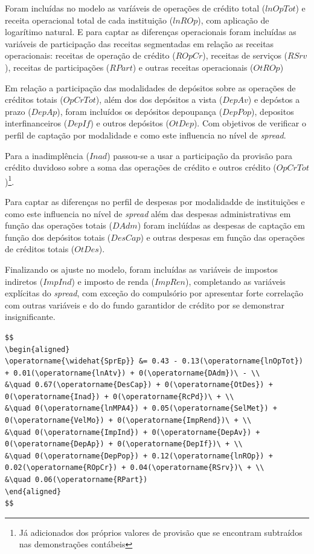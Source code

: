\documentclass[12pt,12pt,openright,oneside,a4paper,chapter=TITLE,section=TITLE,subsection=TITLE,subsubsection=TITLE,english,french,spanish,portugues,sumario=tradicional]{abntex2}
\begin{document}
Foram incluídas no modelo as varíáveis de operações de crédito total (\(lnOpTot\)) e receita operacional total de cada instituição (\(lnROp\)), com aplicação de logarítimo natural. E para captar as diferenças operacionais foram incluídas as variáveis de participação das receitas segmentadas em relação as receitas operacionais: receitas de operação de crédito (\(ROpCr\)), receitas de serviços (\(RSrv\)), receitas de participações (\(RPart\)) e outras receitas operacionais (\(OtROp\))

Em relação a participação das modalidades de depósitos sobre as operações de créditos totais (\(OpCrTot\)), além dos dos depósitos a vista (\(DepAv\)) e depóstos a prazo (\(DepAp\)), foram incluídos os depósitos depoupança (\(DepPop\)), depositos interfinanceiros (\(DepIf\)) e outros depósitos (\(OtDep\)). Com objetivos de verificar o perfil de captação por modalidade e como este influencia no nível de \emph{spread}.

Para a inadimplência (\(Inad\)) passou-se a usar a participação da provisão para crédito duvidoso sobre a soma das operações de crédito e outros crédito (\(OpCrTot\))\footnote{Já adicionados dos próprios valores de provisão que se encontram subtraídos nas demonstrações contábeis}.

Para captar as diferenças no perfil de despesas por modalidadde de instituições e como este influencia no nível de \emph{spread} além das despesas administrativas em função das operações totais (\(DAdm\)) foram inclúídas as despesas de captação em função dos depósitos totais (\(DesCap\)) e outras despesas em função das operações de créditos totais (\(OtDes\)).

Finalizando os ajuste no modelo, foram incluídas as variáveis de impostos indiretos (\(ImpInd\)) e imposto de renda (\(ImpRen\)), completando as variáveis explícitas do \emph{spread}, com exceção do compulsório por apresentar forte correlação com outras variáveis e do do fundo garantidor de crédito por se demonstrar insignificante.

\begin{verbatim}
$$
\begin{aligned}
\operatorname{\widehat{SprEp}} &= 0.43 - 0.13(\operatorname{lnOpTot}) + 0.01(\operatorname{lnAtv}) + 0(\operatorname{DAdm})\ - \\
&\quad 0.67(\operatorname{DesCap}) + 0(\operatorname{OtDes}) + 0(\operatorname{Inad}) + 0(\operatorname{RcPd})\ + \\
&\quad 0(\operatorname{lnMPA4}) + 0.05(\operatorname{SelMet}) + 0(\operatorname{VelMo}) + 0(\operatorname{ImpRend})\ + \\
&\quad 0(\operatorname{ImpInd}) + 0(\operatorname{DepAv}) + 0(\operatorname{DepAp}) + 0(\operatorname{DepIf})\ + \\
&\quad 0(\operatorname{DepPop}) + 0.12(\operatorname{lnROp}) + 0.02(\operatorname{ROpCr}) + 0.04(\operatorname{RSrv})\ + \\
&\quad 0.06(\operatorname{RPart})
\end{aligned}
$$
\end{verbatim}
\end{document}
